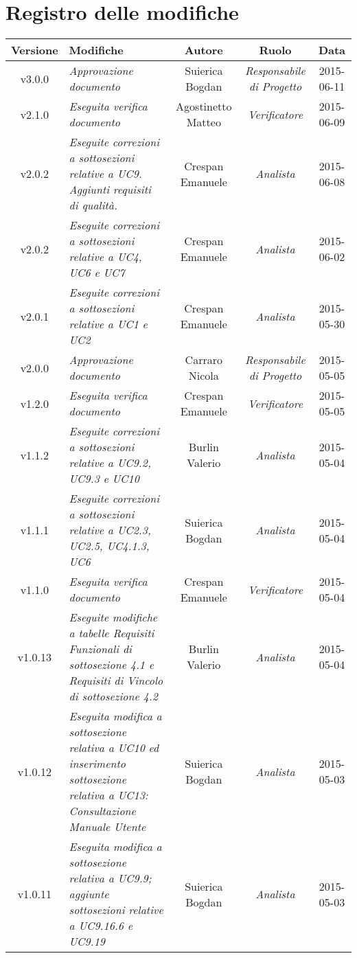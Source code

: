 \newpage
\section*{Registro delle modifiche}

\begin{table}[h]
\centering
\begin{tabular}{|c|p{}|c|c|c|}
	\toprule
		\textbf{Versione} & \textbf{Modifiche} & \textbf{Autore} & \textbf{Ruolo} & \textbf{Data}\\
	\midrule
	\midrule
		v3.0.0 & \textit{Approvazione documento} & Suierica Bogdan & \textit{Responsabile di Progetto} & 2015-06-11 \\
	\midrule
		v2.1.0 & \textit{Eseguita verifica documento} & Agostinetto Matteo & \textit{Verificatore} & 2015-06-09 \\
	\midrule
		v2.0.2 & \textit{Eseguite correzioni a sottosezioni relative a UC9. Aggiunti requisiti di qualità.} & Crespan Emanuele & \textit{Analista} & 2015-06-08 \\
	\midrule
		v2.0.2 & \textit{Eseguite correzioni a sottosezioni relative a UC4, UC6 e UC7} & Crespan Emanuele & \textit{Analista} & 2015-06-02 \\
	\midrule
		v2.0.1 & \textit{Eseguite correzioni a sottosezioni relative a UC1 e UC2} & Crespan Emanuele & \textit{Analista} & 2015-05-30 \\
	\midrule
		v2.0.0 & \textit{Approvazione documento} & Carraro Nicola & \textit{Responsabile di Progetto} & 2015-05-05 \\
	\midrule
		v1.2.0 & \textit{Eseguita verifica documento} & Crespan Emanuele & \textit{Verificatore} & 2015-05-05 \\
	\midrule
		v1.1.2 & \textit{Eseguite correzioni a sottosezioni relative a UC9.2, UC9.3 e UC10} & Burlin Valerio & \textit{Analista} & 2015-05-04\\
	\midrule
		v1.1.1 & \textit{Eseguite correzioni a sottosezioni relative a UC2.3, UC2.5, UC4.1.3, UC6} & Suierica Bogdan & \textit{Analista} & 2015-05-04\\
	\midrule
		v1.1.0 & \textit{Eseguita verifica documento} & Crespan Emanuele & \textit{Verificatore} & 2015-05-04\\
	\midrule
		v1.0.13 & \textit{Eseguite modifiche a tabelle Requisiti Funzionali di sottosezione 4.1 e Requisiti di Vincolo di sottosezione 4.2} & Burlin Valerio & \textit{Analista} & 2015-05-04\\
	\midrule
		v1.0.12 & \textit{Eseguita modifica a sottosezione relativa a UC10 ed inserimento sottosezione relativa a UC13: Consultazione Manuale Utente} & Suierica Bogdan & \textit{Analista} & 2015-05-03\\
	\midrule
		v1.0.11 & \textit{Eseguita modifica a sottosezione relativa a UC9.9; aggiunte sottosezioni relative a UC9.16.6 e UC9.19} & Suierica Bogdan & \textit{Analista} & 2015-05-03\\

	\bottomrule
\end{tabular}
\end{table}
